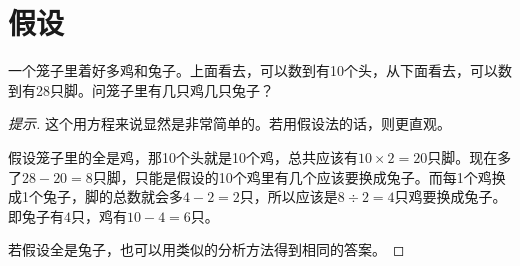 \section{假设}
\label{sec:assumption}

\begin{example}[鸡兔同笼]
  一个笼子里着好多鸡和兔子。上面看去，可以数到有10个头，从下面看去，可以数到有28只脚。问笼子里有几只鸡几只兔子？
\end{example}
\begin{proof}[提示]
  这个用方程来说显然是非常简单的。若用假设法的话，则更直观。

  假设笼子里的全是鸡，那10个头就是10个鸡，总共应该有$10\times2=20$只脚。现在多了$28-20=8$只脚，只能是假设的10个鸡里有几个应该要换成兔子。而每1个鸡换成1个兔子，脚的总数就会多$4-2=2$只，所以应该是$8\div 2=4$只鸡要换成兔子。即兔子有$4$只，鸡有$10-4=6$只。

  若假设全是兔子，也可以用类似的分析方法得到相同的答案。
\end{proof}